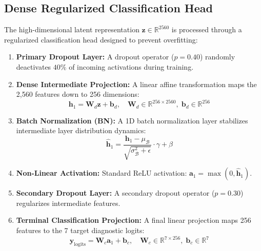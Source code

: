 \documentclass[journal,10pt,twocolumn]{IEEEtran}
\begin{document}
\subsection{Dense Regularized Classification Head}
The high-dimensional latent representation $\mathbf{z} \in \mathbb{R}^{2560}$ is processed through a regularized classification head designed to prevent overfitting:
\begin{enumerate}[leftmargin=*]
    \item \textbf{Primary Dropout Layer:} A dropout operator ($p = 0.40$) randomly deactivates $40\%$ of incoming activations during training.
    \item \textbf{Dense Intermediate Projection:} A linear affine transformation maps the 2,560 features down to 256 dimensions:
    \begin{equation}
    \mathbf{h}_1 = \mathbf{W}_d \mathbf{z} + \mathbf{b}_d, \quad \mathbf{W}_d \in \mathbb{R}^{256 \times 2560}, \; \mathbf{b}_d \in \mathbb{R}^{256}
    \end{equation}
    \item \textbf{Batch Normalization (BN):} A 1D batch normalization layer stabilizes intermediate layer distribution dynamics:
    \begin{equation}
    \widehat{\mathbf{h}}_1 = \frac{\mathbf{h}_1 - \mu_{\mathcal{B}}}{\sqrt{\sigma_{\mathcal{B}}^2 + \epsilon}} \cdot \gamma + \beta
    \end{equation}
    \item \textbf{Non-Linear Activation:} Standard ReLU activation: $\mathbf{a}_1 = \max(0, \widehat{\mathbf{h}}_1)$.
    \item \textbf{Secondary Dropout Layer:} A secondary dropout operator ($p = 0.30$) regularizes intermediate features.
    \item \textbf{Terminal Classification Projection:} A final linear projection maps 256 features to the 7 target diagnostic logits:
    \begin{equation}
    \mathbf{y}_{\text{logits}} = \mathbf{W}_c \mathbf{a}_1 + \mathbf{b}_c, \quad \mathbf{W}_c \in \mathbb{R}^{7 \times 256}, \; \mathbf{b}_c \in \mathbb{R}^7
    \end{equation}
\end{enumerate}
\end{document}
